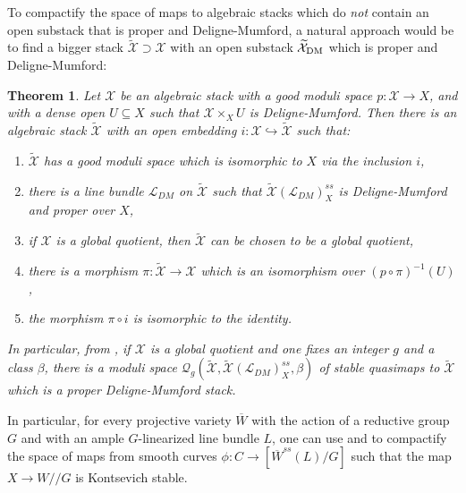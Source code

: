\documentclass{amsart}
\newcommand{\cL}{\mathcal{L}}
\newcommand{\cQ}{\mathcal{Q}}
\newcommand{\cX}{\mathcal{X}}
\newcommand{\dm}{{\rm DM}}
\newtheorem{Teo}[theorem]{Theorem}
\theoremstyle{definition}
\newcommand{\marg}[1]{\normalsize{{\color{red}\footnote{{\color{blue}#1}}}{\marginpar[{\color{red}\hfill\tiny\thefootnote$\rightarrow$}]{{\color{red}$\leftarrow$\tiny\thefootnote}}}}}
\newcommand{\Gio}[1]{\marg{(Giovanni) #1}}
\theoremstyle{definition}
\begin{document}
{To compactify the space of maps to algebraic stacks which do \textit{not} contain an open substack that is proper and Deligne-Mumford, {a natural approach would be to find a bigger stack $\widetilde{\cX}\supset \cX$ with an open substack $\widetilde{\cX}_\dm$ which is proper and Deligne-Mumford:}
\begin{Teo}\label{thm_intro_you_can_embed_a_Stack_in_one_with_open_dm_by_taking_deformations_to_nc}
    Let $\cX$ be an algebraic stack with a good moduli space $p:\cX\to X$, and with a dense open $U\subseteq X$ such that $\cX\times_XU$ is Deligne-Mumford. Then there is an algebraic stack $\widetilde{\cX}$ with an open embedding $i:\cX\hookrightarrow \widetilde{\cX}$ such that:
    \begin{enumerate}
        \item $\widetilde{\cX}$ has a good moduli space which is isomorphic to $X$ via the inclusion $i$,
        \item there is a line bundle $\cL_{DM}$ on $\widetilde{\cX}$ such that $\widetilde{\cX}(\cL_{DM})^{ss}_X$ is  Deligne-Mumford and proper over $X$,
        \item if $\cX$ is a global quotient, then $\widetilde{\cX}$ can be chosen to be a global quotient,
        \item there is a morphism $\pi:\widetilde{\cX}\to \cX$ which is an isomorphism over $(p\circ \pi)^{-1}(U)$,
        \item the morphism $\pi\circ i$ is isomorphic to the identity.
    \end{enumerate}
    In particular, from , if $\cX$ is a global quotient and one fixes an integer $g$ and a class $\beta$, there is a moduli space $\cQ_g(\widetilde{\cX},\widetilde{\cX}(\cL_{DM})^{ss}_X,\beta)$ of stable quasimaps to $\widetilde{\cX}$ which is a proper Deligne-Mumford stack. 
\end{Teo}
In particular, for every projective variety $\overline{W}$ with the action of a reductive group $G$ and with an ample $G$-linearized line bundle $L$, one can use  and  to compactify the space of maps from smooth curves $\phi\colon C\to[\overline{W}^{ss}(L)/G]$ such that the map $X\to W/\!\!/G$ is Kontsevich stable.

}
\end{document}
